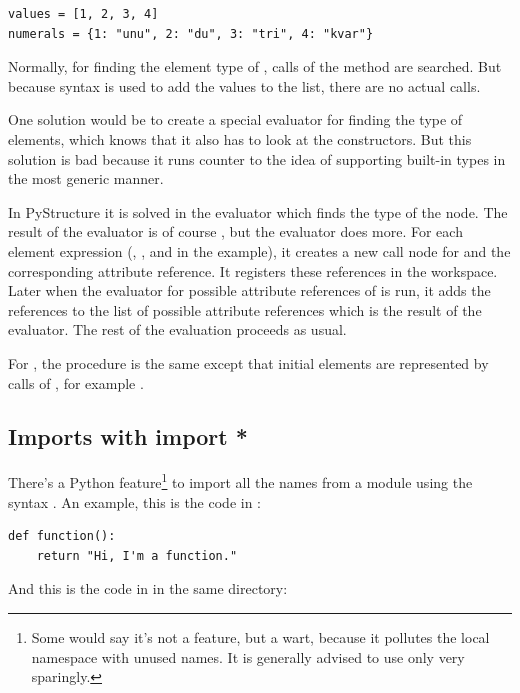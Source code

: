 \documentclass[12pt,halfparskip,DIV11,BCOR10mm]{scrreprt}
\begin{document}
\begin{lstlisting}
values = [1, 2, 3, 4]
numerals = {1: "unu", 2: "du", 3: "tri", 4: "kvar"}
\end{lstlisting}

Normally, for finding the element type of , calls of the method  are searched. But because syntax is used to add the values to the list, there are no actual  calls.

One solution would be to create a special evaluator for finding the type of  elements, which knows that it also has to look at the constructors. But this solution is bad because it runs counter to the idea of supporting built-in types in the most generic manner.

In PyStructure it is solved in the evaluator which finds the type of the  node. The result of the evaluator is of course , but the evaluator does more. For each element expression (, ,  and  in the example), it creates a new call node for  and the corresponding attribute reference. It registers these references in the workspace. Later when the evaluator for possible attribute references of  is run, it adds the references to the list of possible attribute references which is the result of the evaluator. The rest of the evaluation proceeds as usual.

For , the procedure is the same except that initial elements are represented by calls of , for example .

\subsection{Imports with import *}
\label{import_star}

There's a Python feature\footnote{Some would say it's not a feature, but a wart, because it pollutes the local namespace with unused names. It is generally advised to use  only very sparingly.} to import all the names from a module using the syntax . An example, this is the code in :

\begin{lstlisting}
def function():
    return "Hi, I'm a function."
\end{lstlisting}

And this is the code in  in the same directory:
\end{document}
